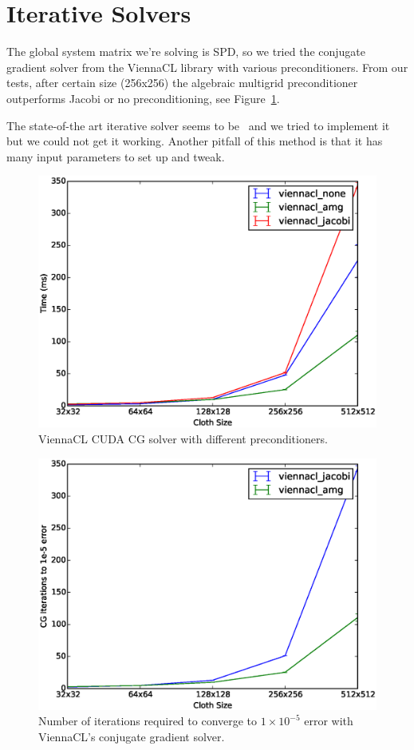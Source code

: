 \documentclass{article}
\begin{document}
\section{Iterative Solvers}
The global system matrix we're solving is SPD, so we tried the conjugate gradient
solver from the ViennaCL library with various preconditioners. From our tests,
after certain size (256x256) the algebraic multigrid preconditioner outperforms Jacobi
or no preconditioning, see Figure~\ref{fig:viennacl_preconds}.

The state-of-the art iterative solver seems to be~\cite{Wang15} and we tried
to implement it but we could not get it working. Another pitfall of this method
is that it has many input parameters to set up and tweak.

\begin{figure}[htb!]
	\centering
	\includegraphics[width=0.9\linewidth]{img/viennacl_none_jacobi_amg}
	\caption{ViennaCL CUDA CG solver with different preconditioners.
	\label{fig:viennacl_preconds}}
\end{figure}

\begin{figure}[htb!]
        \centering
		\includegraphics[width=0.9\linewidth]{img/amg_vs_jacobi_iters}
		\caption{Number of iterations required to converge to $1 \times 10^{-5}$ error with ViennaCL's
			conjugate gradient solver. \label{fig:amg_vs_jacobi_iters}}
\end{figure}
\end{document}
